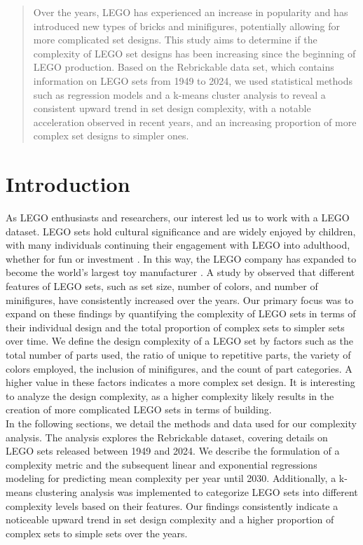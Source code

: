 \documentclass{article}
\theoremstyle{plain}
\theoremstyle{definition}
\theoremstyle{remark}
\begin{document}
	\begin{abstract}
		Over the years, LEGO has experienced an increase in popularity and has introduced new types of bricks and minifigures, potentially allowing for more complicated set designs. This study aims to determine if the complexity of LEGO set designs has been increasing since the beginning of LEGO production. Based on the Rebrickable data set, which contains information on LEGO sets from 1949 to 2024, we used statistical methods such as regression models and a k-means cluster analysis to reveal a consistent upward trend in set design complexity, with a notable acceleration observed in recent years, and an increasing proportion of more complex set designs to simpler ones.
		
	\end{abstract}
	
	\section{Introduction}\label{sec:intro}
	As LEGO enthusiasts and researchers, our interest led us to work with a LEGO dataset. LEGO sets hold cultural significance and are widely enjoyed by children, with many individuals continuing their engagement with LEGO into adulthood, whether for fun or investment \cite{dobrynskaya2018LEGO}. In this way, the LEGO company has expanded to become the world's largest toy manufacturer \cite{mazzarella2019let}. A study by \citet{legocomplexity} observed that different features of LEGO sets, such as set size, number of colors, and number of minifigures, have consistently increased over the years. Our primary focus was to expand on these findings by quantifying the complexity of LEGO sets in terms of their individual design and the total proportion of complex sets to simpler sets over time. We define the design complexity of a LEGO set by factors such as the total number of parts used, the ratio of unique to repetitive parts, the variety of colors employed, the inclusion of minifigures, and the count of part categories. A higher value in these factors indicates a more complex set design. It is interesting to analyze the design complexity, as a higher complexity likely results in the creation of more complicated LEGO sets in terms of building.\\
	In the following sections, we detail the methods and data used for our complexity analysis. The analysis explores the Rebrickable dataset, covering details on LEGO sets released between 1949 and 2024. We describe the formulation of a complexity metric and the subsequent linear and exponential regressions modeling for predicting mean complexity per year until 2030. Additionally, a k-means clustering analysis was implemented to categorize LEGO sets into different complexity levels based on their features. Our findings consistently indicate a noticeable upward trend in set design complexity and a higher proportion of complex sets to simple sets over the years.
	
\end{document}
